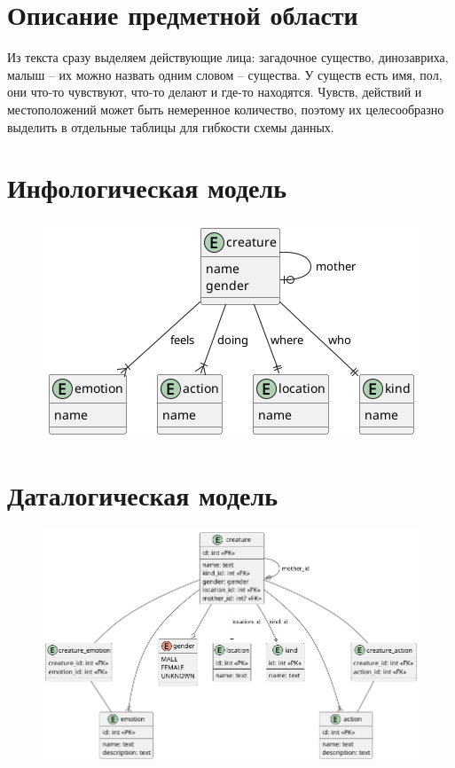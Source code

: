 \documentclass{article}
\begin{document}
\section{Описание предметной области}

Из текста сразу выделяем действующие лица:
загадочное существо, динозавриха,
малыш -- их можно назвать одним словом --
существа. У существ есть имя, пол, они что-то
чувствуют, что-то делают и где-то находятся.
Чувств, действий и местоположений может быть
немеренное количество, поэтому их целесообразно
выделить в отдельные таблицы для гибкости схемы
данных.

\section{Инфологическая модель}

\begin{figure}[th]
    \includegraphics[scale=0.5]{./high-er-diagram.png}
    \centering
\end{figure}

\newpage

\section{Даталогическая модель}

\begin{figure}[th]
    \includegraphics[scale=0.5]{./low-er-diagram.png}
    \centering
\end{figure}
\end{document}
